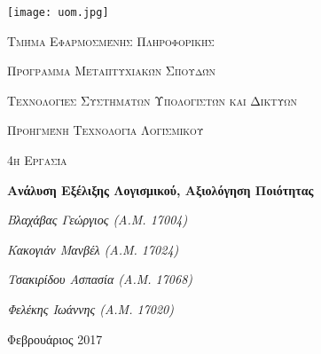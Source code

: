 \begin{titlepage}
	\centering
	\texttt{[image: uom.jpg]}\par\vspace{1cm}
	{\scshape\Large Τμήμα Εφαρμοσμένης Πληροφορικής\par}
	\vspace{1em}
	{\scshape\Large Πρόγραμμα Μεταπτυχιακών Σπουδών\par}
	\vspace{1em}
	{\scshape\Large Τεχνολογίες Συστημάτων Υπολογιστών και Δικτύων\par}
	\vspace{1cm}
	{\scshape\LARGE Προηγμένη Τεχνολογία Λογισμικού\par}
	\vspace{1.5cm}
	{\scshape\Large 4η Εργασία\par}
	{\huge\bfseries Ανάλυση Εξέλιξης Λογισμικού, Αξιολόγηση Ποιότητας \par}
	\vspace{3cm}
	{\Large\itshape Βλαχάβας Γεώργιος (Α.Μ. 17004) \par}
	\vspace{1em}
	{\Large\itshape Κακογιάν Μανβέλ (Α.Μ. 17024) \par}
	\vspace{1em}
	{\Large\itshape Τσακιρίδου Ασπασία (Α.Μ. 17068) \par}
	\vspace{1em}
	{\Large\itshape Φελέκης Ιωάννης	(Α.Μ. 17020) \par}
	\vfill

	{\large Φεβρουάριος 2017\par}
\end{titlepage}
